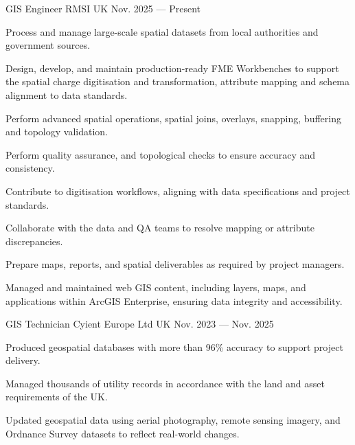 \begin{cventries}
\cventry
{GIS Engineer} %
{RMSI} %
{UK} %
{Nov. 2025 --- Present} %
{
\begin{cvitems}
\item {Process and manage large-scale spatial datasets from local authorities and government sources.}
\item {Design, develop, and maintain production-ready FME Workbenches to support the spatial charge digitisation and transformation, attribute mapping and schema alignment to data standards.}
\item {Perform advanced spatial operations, spatial joins, overlays, snapping, buffering and topology validation.}
\item {Perform quality assurance, and topological checks to ensure accuracy and consistency.}
\item {Contribute to digitisation workflows, aligning with data specifications and project standards.}
\item {Collaborate with the data and QA teams to resolve mapping or attribute discrepancies.}
\item {Prepare maps, reports, and spatial deliverables as required by project managers.}
\item {Managed and maintained web GIS content, including layers, maps, and applications within ArcGIS Enterprise, ensuring data integrity and accessibility.}
\vspace{0.8em}
\end{cvitems}
}
\cventry
{GIS Technician} %
{Cyient Europe Ltd} %
{UK} %
{Nov. 2023 --- Nov. 2025} %
{
\begin{cvitems}
\item {Produced geospatial databases with more than 96\% accuracy to support project delivery.}
\item {Managed thousands of utility records in accordance with the land and asset requirements of the UK.}
\item {Updated geospatial data using aerial photography, remote sensing imagery, and Ordnance Survey datasets to reflect real-world changes.}

\end{cvitems}}
\end{cventries}
